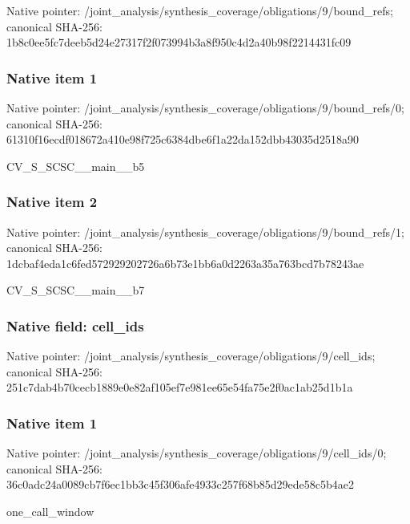 \documentclass[10pt,a4paper]{article}
\begin{document}
Native pointer: /joint\_analysis/synthesi\allowbreak{}s\_coverage/obligations/9\allowbreak{}/bound\_refs; canonical SHA-256: 1b8c0ee5fc7deeb5d24e2731\allowbreak{}7f2f073994b3a8f950c4d2a4\allowbreak{}0b98f2214431fc09



\subsubsection{Native item 1}


Native pointer: /joint\_analysis/synthesi\allowbreak{}s\_coverage/obligations/9\allowbreak{}/bound\_refs/0; canonical SHA-256: 61310f16ecdf018672a410e9\allowbreak{}8f725c6384dbe6f1a22da152\allowbreak{}dbb43035d2518a90


CV\_S\_SCSC\_\_main\_\_b5


\subsubsection{Native item 2}


Native pointer: /joint\_analysis/synthesi\allowbreak{}s\_coverage/obligations/9\allowbreak{}/bound\_refs/1; canonical SHA-256: 1dcbaf4eda1c6fed57292920\allowbreak{}2726a6b73e1bb6a0d2263a35\allowbreak{}a763bcd7b78243ae


CV\_S\_SCSC\_\_main\_\_b7


\subsubsection{Native field: cell\_ids}


Native pointer: /joint\_analysis/synthesi\allowbreak{}s\_coverage/obligations/9\allowbreak{}/cell\_ids; canonical SHA-256: 251c7dab4b70cecb1889e0e8\allowbreak{}2af105ef7e981ee65e54fa75\allowbreak{}e2f0ac1ab25d1b1a



\subsubsection{Native item 1}


Native pointer: /joint\_analysis/synthesi\allowbreak{}s\_coverage/obligations/9\allowbreak{}/cell\_ids/0; canonical SHA-256: 36c0adc24a0089cb7f6ec1bb\allowbreak{}3c45f306afe4933c257f68b8\allowbreak{}5d29ede58c5b4ae2


one\_call\_window
\end{document}
